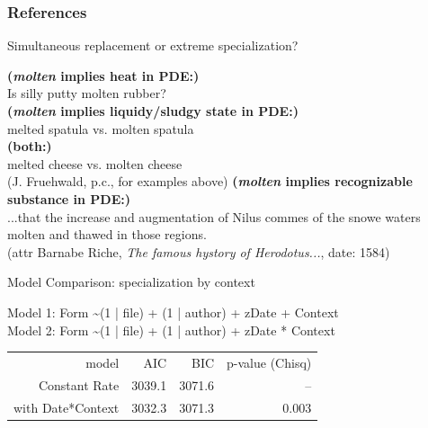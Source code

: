\documentclass[hyperref={pdfpagelabels=false}]{beamer}
\begin{document}
\begin{frame}[allowframebreaks]
\frametitle{References}
\newcommand*{\newblock}{natbib}


\end{frame}


\begin{frame}{Simultaneous replacement or extreme specialization?}
		\begin{exe}
			\ex \textbf{(\textsl{molten} implies heat in PDE:)}\\
			Is silly putty molten rubber?\\
			\ex \textbf{(\textsl{molten} implies liquidy/sludgy state in PDE:)}\\
			melted spatula vs. molten spatula\\
			\ex \textbf{(both:)}\\
			melted cheese vs. molten cheese\\
			(J. Fruehwald, p.c., for examples above)
			\ex \textbf{(\textsl{molten} implies recognizable substance in PDE:)}\\
			...that the increase and augmentation of Nilus commes of the snowe waters molten and thawed in those regions.\\
			(attr Barnabe Riche, \textsl{The famous hystory of Herodotus...}, date: 1584)
		\end{exe}
		
\end{frame}

\begin{frame}{Model Comparison: specialization by context}

\begin{center}
Model 1: Form \textasciitilde  (1 | file) + (1 | author) + zDate + Context\\
\vspace*{1mm}
Model 2: Form \textasciitilde  (1 | file) + (1 | author) + zDate{  }*{  }Context\\
\vspace*{4mm}

	\begin{tabular}{rrrr}
\toprule
	model & AIC & BIC & p-value (Chisq)\\
	\cmidrule{2-4}
Constant Rate & 3039.1 & 3071.6 & -- \\
with Date*Context &  3032.3 & 3071.3 & 0.003\\
\bottomrule
\end{tabular}
\end{center}
\end{frame}
\end{document}
